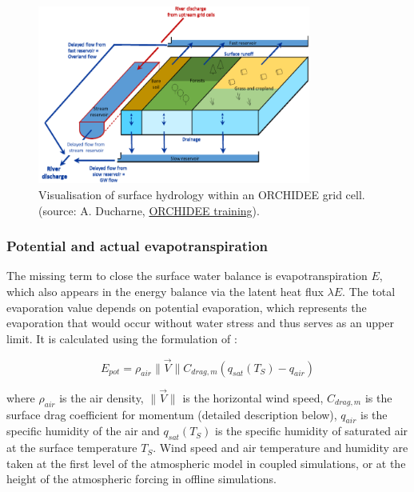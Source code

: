 \begin{figure}[hbtp]
    \centering
    \includegraphics[width=0.8\textwidth]{images/methods/water_balance_AD.png}
    \caption{Visualisation of surface hydrology within an ORCHIDEE grid cell. (source: A. Ducharne, \href{https://forge.ipsl.fr/orchidee/attachment/wiki/GroupActivities/Training/cours_orchidee_feb2024_ducharne.pdf}{ORCHIDEE training}).}
    \label{fig:water_balance_AD}
\end{figure}


\subsubsection*{Potential and actual evapotranspiration}

The missing term to close the surface water balance is evapotranspiration $E$, which also appears in the energy balance via the latent heat flux $\lambda E$. The total evaporation value depends on potential evaporation, which represents the evaporation that would occur without water stress and thus serves as an upper limit. It is calculated using the formulation of \citet{Budyko_1956}:  

\begin{equation}
    E_{pot} = \rho_{air}  \lVert \vec{V} \rVert C_{drag, m} (q_{sat}(T_S) - q_{air})
\end{equation}

where $\rho_{air}$ is the air density, $\lVert \vec{V} \rVert$ is the horizontal wind speed, $C_{drag, m}$ is the surface drag coefficient for momentum (detailed description below), $q_{air}$ is the specific humidity of the air and $q_{sat}(T_S)$ is the specific humidity of saturated air at the surface temperature $T_S$. Wind speed and air temperature and humidity are taken at the first level of the atmospheric model in coupled simulations, or at the height of the atmospheric forcing in offline simulations.

